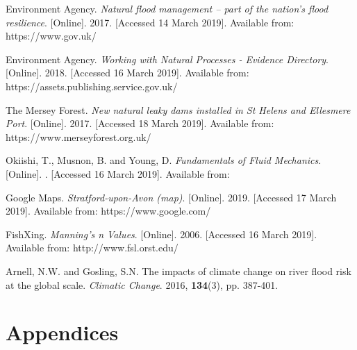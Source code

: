 \documentclass[11pt,a4paper]{article}
\begin{document}
\begin{thebibliography}{}
Environment Agency. \textit{Natural flood management – part of the nation’s flood resilience}. [Online]. 2017. [Accessed 14 March 2019]. Available from: https://www.gov.uk/

Environment Agency. \textit{Working with Natural Processes - Evidence Directory}. [Online]. 2018. [Accessed 16 March 2019]. Available from: https://assets.publishing.service.gov.uk/

The Mersey Forest. \textit{New natural leaky dams installed in St Helens and Ellesmere Port}. [Online]. 2017. [Accessed 18 March 2019]. Available from: https://www.merseyforest.org.uk/

Okiishi, T., Musnon, B. and Young, D. \textit{Fundamentals of Fluid Mechanics}. [Online]. . [Accessed 16 March 2019]. Available from: 

Google Maps. \textit{Stratford-upon-Avon (map)}. [Online]. 2019. [Accessed 17 March 2019]. Available from: https://www.google.com/

FishXing. \textit{Manning's n Values}. [Online]. 2006. [Accessed 16 March 2019]. Available from: http://www.fsl.orst.edu/

Arnell, N.W. and Gosling, S.N. The impacts of climate change on river flood risk at the global scale. \textit{Climatic Change}. 2016, \textbf{134}(3), pp. 387-401.
\end{thebibliography}

\appendix
\section{Appendices}
\end{document}
